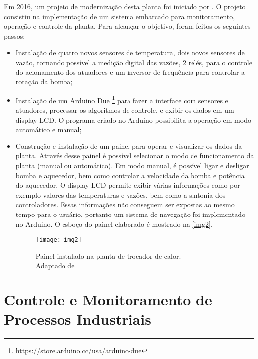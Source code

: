 		Em 2016, um projeto de modernização desta planta foi iniciado por \cite{luiz2016}.  O projeto consistiu na implementação de um sistema embarcado para monitoramento, operação e controle da planta. Para alcançar o objetivo, foram feitos os seguintes passos:
		\begin{itemize}
			\item 
			Instalação de quatro novos sensores de temperatura, dois novos sensores de vazão, tornando possível a medição digital das vazões, 2 relés, para o controle do acionamento dos atuadores e um inversor de frequência para controlar a rotação da bomba;
			\item 
			Instalação de um Arduino Due \footnote{\url{https://store.arduino.cc/usa/arduino-due}} para fazer a interface com sensores e atuadores, processar os algoritmos de controle, e exibir os dados em um display LCD. O programa criado no Arduino possibilita a operação em modo automático e manual;
			\item 
			Construção e instalação de um painel para operar e visualizar os dados da planta. Através desse painel é possível selecionar o modo de funcionamento da planta (manual ou automático). Em modo manual, é possível ligar e desligar bomba e aquecedor, bem como controlar a velocidade da bomba e potência do aquecedor. O display LCD permite exibir várias informações como por exemplo valores das temperaturas e vazões, bem como a sintonia dos controladores. Essas informações não conseguem ser expostas ao mesmo tempo para o usuário, portanto um sistema de navegação foi implementado no Arduino. O esboço do painel elaborado é mostrado na \autoref{img2}.
			
			\begin{figure}[!htb]	
				\captionsetup{justification=centering}
				\begin{center}
					\texttt{[image: img2]}  %
					\caption[Painel instalado na planta de trocador de calor]{\label{img2}Painel instalado na planta de trocador de calor. \\Adaptado de \cite{luiz2016}}
				\end{center}		
			\end{figure}
		
		\end{itemize}
	
	\section{Controle e Monitoramento de Processos Industriais}
		
